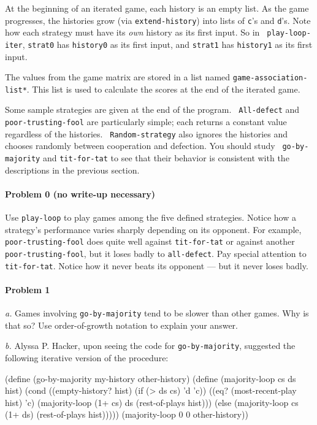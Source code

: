 At the beginning of an iterated game, each history is an empty list.
As the game progresses, the histories grow (via {\tt extend-history})
into lists of {\tt c}'s and {\tt d}'s. Note how each strategy must
have its {\it own} history as its first input. So in {\tt
play-loop-iter}, {\tt strat0} has {\tt history0} as its first input,
and {\tt strat1} has {\tt history1} as its first input.

The values from the game matrix are stored in a list named
{\tt *game-association-list*}. This list is used to calculate the scores at
the end of the iterated game.

Some sample strategies are given at the end of the program. {\tt
All-defect} and {\tt poor-trusting-fool} are particularly simple; each
returns a constant value regardless of the histories. {\tt
Random-strategy} also ignores the histories and chooses randomly
between cooperation and defection. You should study {\tt 
go-by-majority} and {\tt tit-for-tat} to see that their behavior is
consistent with the descriptions in the previous section.

\paragraph{Problem 0 (no write-up necessary)}
Use {\tt play-loop} to play games among the five defined strategies.
Notice how a strategy's performance varies sharply depending on its
opponent.  For example, {\tt poor-trusting-fool} does quite well
against {\tt tit-for-tat} or against another {\tt poor-trusting-fool},
but it loses badly to {\tt all-defect}.  Pay special attention to {\tt
tit-for-tat}. Notice how it never beats its opponent --- but it never
loses badly.

\paragraph{Problem 1}
{\it a.} Games involving {\tt go-by-majority} tend to be slower than
other games. Why is that so? Use order-of-growth notation to explain
your answer.

{\it b.} Alyssa P. Hacker, upon seeing the code for {\tt go-by-majority},
suggested the following iterative version of the procedure:

\beginlisp
(define (go-by-majority my-history other-history)
  (define (majority-loop cs ds hist)
    (cond ((empty-history? hist) (if (> ds cs) 'd 'c))
          ((eq? (most-recent-play hist) 'c)
           (majority-loop (1+ cs) ds (rest-of-plays hist)))
          (else
           (majority-loop cs (1+ ds) (rest-of-plays hist)))))
  (majority-loop 0 0 other-history))
\endlisp

